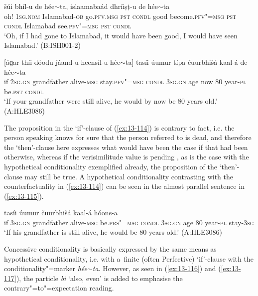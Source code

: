 \begin{exe}
\ex
\label{ex:13-113}
 šúi bhíl-u de hée$\sim$ta,
islaamabaád  dhríiṣṭ-u de hée$\sim$ta \\
oh! \textsc{1sg.nom} Islamabad-\textsc{ob} go.\textsc{pfv.msg} \textsc{pst}  \textsc{condl} good become.\textsc{pfv"=msg} \textsc{pst} \textsc{condl} Islamabad see.\textsc{pfv"=msg} \textsc{pst} \textsc{condl} \\
\glt `Oh, if I had gone to Islamabad, it would have been good, I would have seen Islamabad.' (B:ISH001-2)

\ex
\label{ex:13-114}
\gll \label{bkm:Ref190830564}[áɡar thíi dóodu ǰáand-u heensíl-u  hée$\sim$ta]
tasíi úumur típa čuurbhišá kaal-á de  hée$\sim$ta \\
if \textsc{2sg.gn} grandfather alive-\textsc{msg} stay.\textsc{pfv"=msg}  \textsc{condl} 
\textsc{3sg.gn} age now 80 year-\textsc{pl} be.\textsc{pst} \textsc{condl} \\
\glt `If your grandfather were still alive, he would by now be 80 years old.' (A:HLE3086) 
\end{exe}

The proposition in the `if'-clause of (\ref{ex:13-114}) is contrary to fact, i.e. the person speaking knows for sure that the person referred to is dead, and therefore the `then'-clause here expresses what would have been the case if that had been otherwise, whereas if the verisimilitude value is pending \citep[332]{givon2001b}, as is the case with the hypothetical conditionality exemplified already, the proposition of the `then'-clause may still be true. A hypothetical conditionality contrasting with the counterfactuality in (\ref{ex:13-114}) can be seen in the almost parallel sentence in (\ref{ex:13-115}).

\begin{exe}
\ex
\label{ex:13-115}
 tasíi úumur čuurbhišá kaal-á hóons-a \\
if \textsc{3sg.gn} grandfather alive-\textsc{msg} be.\textsc{prs"=msg}  \textsc{condl} \textsc{3sg.gn} age 80 year-\textsc{pl} stay-\textsc{3sg} \\
\glt `If his grandfather is still alive, he would be 80 years old.' (A:HLE3086) 
\end{exe}

 Concessive conditionality is basically expressed by the same means as hypothetical conditionality, i.e. with a~finite (often Perfective) `if'-clause with the conditionality"=marker \textit{hée$\sim$ta}. However, as seen in (\ref{ex:13-116}) and (\ref{ex:13-117}), the particle \textit{bi} `also, even' is added to emphasise the contrary"=to"=expectation reading. 

